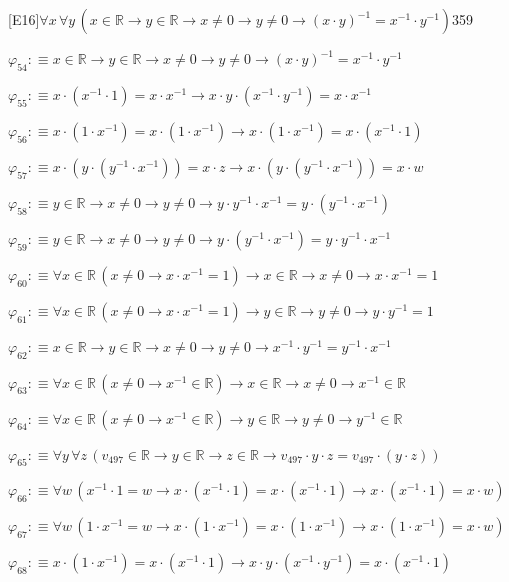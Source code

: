 \begin{fullproof}{[E16]}{$\forall x\,\forall y\,(x \in \mathbb{R} \to y \in \mathbb{R} \to x \neq 0 \to y \neq 0 \to (x \cdot y)^{-1} = x^{-1} \cdot y^{-1})$}{359}
\begin{abbrevlist}
\item $\varphi_{54} :\equiv x \in \mathbb{R} \to y \in \mathbb{R} \to x \neq 0 \to y \neq 0 \to (x \cdot y)^{-1} = x^{-1} \cdot y^{-1}$
\item $\varphi_{55} :\equiv x \cdot (x^{-1} \cdot 1) = x \cdot x^{-1} \to x \cdot y \cdot (x^{-1} \cdot y^{-1}) = x \cdot x^{-1}$
\item $\varphi_{56} :\equiv x \cdot (1 \cdot x^{-1}) = x \cdot (1 \cdot x^{-1}) \to x \cdot (1 \cdot x^{-1}) = x \cdot (x^{-1} \cdot 1)$
\item $\varphi_{57} :\equiv x \cdot (y \cdot (y^{-1} \cdot x^{-1})) = x \cdot z \to x \cdot (y \cdot (y^{-1} \cdot x^{-1})) = x \cdot w$
\item $\varphi_{58} :\equiv y \in \mathbb{R} \to x \neq 0 \to y \neq 0 \to y \cdot y^{-1} \cdot x^{-1} = y \cdot (y^{-1} \cdot x^{-1})$
\item $\varphi_{59} :\equiv y \in \mathbb{R} \to x \neq 0 \to y \neq 0 \to y \cdot (y^{-1} \cdot x^{-1}) = y \cdot y^{-1} \cdot x^{-1}$
\item $\varphi_{60} :\equiv \forall x \in \mathbb{R}\,(x \neq 0 \to x \cdot x^{-1} = 1) \to x \in \mathbb{R} \to x \neq 0 \to x \cdot x^{-1} = 1$
\item $\varphi_{61} :\equiv \forall x \in \mathbb{R}\,(x \neq 0 \to x \cdot x^{-1} = 1) \to y \in \mathbb{R} \to y \neq 0 \to y \cdot y^{-1} = 1$
\item $\varphi_{62} :\equiv x \in \mathbb{R} \to y \in \mathbb{R} \to x \neq 0 \to y \neq 0 \to x^{-1} \cdot y^{-1} = y^{-1} \cdot x^{-1}$
\item $\varphi_{63} :\equiv \forall x \in \mathbb{R}\,(x \neq 0 \to x^{-1} \in \mathbb{R}) \to x \in \mathbb{R} \to x \neq 0 \to x^{-1} \in \mathbb{R}$
\item $\varphi_{64} :\equiv \forall x \in \mathbb{R}\,(x \neq 0 \to x^{-1} \in \mathbb{R}) \to y \in \mathbb{R} \to y \neq 0 \to y^{-1} \in \mathbb{R}$
\item $\varphi_{65} :\equiv \forall y\,\forall z\,(v_{497} \in \mathbb{R} \to y \in \mathbb{R} \to z \in \mathbb{R} \to v_{497} \cdot y \cdot z = v_{497} \cdot (y \cdot z))$
\item $\varphi_{66} :\equiv \forall w\,(x^{-1} \cdot 1 = w \to x \cdot (x^{-1} \cdot 1) = x \cdot (x^{-1} \cdot 1) \to x \cdot (x^{-1} \cdot 1) = x \cdot w)$
\item $\varphi_{67} :\equiv \forall w\,(1 \cdot x^{-1} = w \to x \cdot (1 \cdot x^{-1}) = x \cdot (1 \cdot x^{-1}) \to x \cdot (1 \cdot x^{-1}) = x \cdot w)$
\item $\varphi_{68} :\equiv x \cdot (1 \cdot x^{-1}) = x \cdot (x^{-1} \cdot 1) \to x \cdot y \cdot (x^{-1} \cdot y^{-1}) = x \cdot (x^{-1} \cdot 1)$

\end{abbrevlist}
\end{fullproof}
